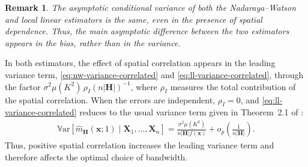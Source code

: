 \documentclass[12pt]{report} %
\newtheorem{remark}{Remark}
\newcommand{\bH}{\mathbf{H}}
\newcommand{\bX}{\mathbf{X}}
\newcommand{\bx}{\mathbf{x}}
\newcommand{\lc}{\left[}
\newcommand{\rc}{\right]}
\newcommand{\V}[1]{\mathbb{V}\mathrm{ar}\lc #1\rc}
\begin{document}
\begin{remark}
The asymptotic conditional variance of both the Nadaraya--Watson and local linear estimators is the same, even in the presence of spatial dependence. Thus, the main asymptotic difference between the two estimators appears in the bias, rather than in the variance.
\end{remark}

In both estimators, the effect of spatial correlation appears in the leading variance term, \eqref{eq:nw-variance-correlated} and \eqref{eq:ll-variance-correlated}, through the factor $\sigma^2\mu(K^2)\,\rho_I (n|\bH|)^{-1}$, where $\rho_I$ measures the total contribution of the spatial correlation. When the errors are independent, $\rho_I=0$, and \eqref{eq:ll-variance-correlated} reduces to the usual variance term given in Theorem~2.1 of \citet{ruppert1994multivariate}:
\begin{align}
    \label{eq:ll-conditional-variance-independent}
    \V{\hat{m}_{\bH}(\bx;1)\mid \bX_1,\ldots,\bX_n}
    =\frac{\sigma^2\mu(K^2)}{n|\bH|f(\bx)}
    + o_p\!\left(\frac{1}{n|\bH|}\right).
\end{align}
Thus, positive spatial correlation increases the leading variance term and therefore affects the optimal choice of bandwidth.
\end{document}
